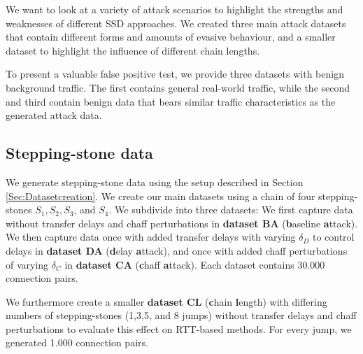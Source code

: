 \documentclass[runningheads,11pt]{llncs}\usepackage[]{graphicx}\usepackage[]{color}
\begin{document}

We want to look at a variety of attack scenarios to highlight the strengths and weaknesses of different SSD approaches. We created three main attack datasets that contain different forms and amounts of evasive behaviour, and a smaller dataset to highlight the influence of different chain lengths. 

To present a valuable false positive test, we provide three datasets with benign background traffic. The first contains general real-world traffic, while the second and third contain benign data that bears similar traffic characteristics as the generated attack data. %


\subsection{Stepping-stone data}

We generate stepping-stone data using the setup described in Section \ref{Sec:Datasetcreation}. We create our main datasets using a chain of four stepping-stones $S_1, S_2, S_3$, and $S_4$. We subdivide into three datasets: We first capture data without transfer delays and chaff perturbations in \textbf{dataset BA} (\textbf{b}aseline \textbf{a}ttack). We then capture data once with added transfer delays with varying $\delta_D$ to control delays in \textbf{dataset DA} (\textbf{d}elay \textbf{a}ttack), and once with added chaff perturbations of varying $\delta_C$ in \textbf{dataset CA} (\textbf{c}haff \textbf{a}ttack). Each dataset contains 30.000 connection pairs.

We furthermore create a smaller \textbf{dataset CL} (\textbf{c}hain \textbf{l}ength) with differing numbers of stepping-stones (1,3,5, and 8 jumps) without transfer delays and chaff perturbations to evaluate this effect on RTT-based methods. For every jump, we generated 1.000 connection pairs.
\end{document}
